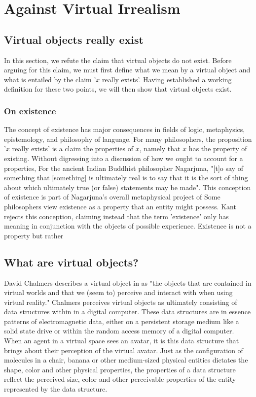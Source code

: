 \section{Against Virtual Irrealism}

\subsection{Virtual objects really exist}
In this section, we refute the claim that virtual objects do not exist. Before arguing for this claim, we must first define what we mean by a virtual object and what is entailed by the claim '$x$ really exists'. Having established a working definition for these two points, we will then show that virtual objects exist.

\subsubsection{On existence}
The concept of existence has major consequences in fields of logic, metaphysics, epistemology, and philosophy of language. For many philosophers, the proposition '$x$ really exists' is a claim  the properties of $x$, namely that $x$ has the property of existing.
Without digressing into a discussion of how we ought to account for a properties,  
 For the ancient Indian Buddhist philosopher Nagarjuna,  
"[t]o say of something that [something] is ultimately real is to say that it is the sort of thing about which ultimately true (or false) statements may be made". \cite{2013nagarjuna} This conception of existence is part of Nagarjuna's overall metaphysical project of   Some philosophers view existence as a property that an entity might possess.  Kant rejects this conception, claiming instead that the term 'existence' only has meaning in conjunction with the objects of possible experience. \cite{thomson2012bacon} Existence is not a property but rather

\subsection{What are virtual objects?  }
David Chalmers describes a virtual object  in \cite{ChalmersVR} as "the objects that are contained in virtual worlds
and that we (seem to) perceive and interact with when using virtual reality." Chalmers perceives virtual objects as ultimately consisting of data structures within in a digital computer. These data structures are in essence patterns of electromagnetic data, either on a persistent storage medium like a solid state drive or within the random access memory of a digital computer. When an agent in a virtual space sees an avatar, it is this data structure
that brings about their perception of the virtual avatar. Just as the configuration of molecules in a chair, banana or other medium-sized physical entities dictates the shape, color and other physical properties, the properties of a data structure reflect the perceived size, color and other perceivable properties of the entity represented by the data structure. 
\newline

